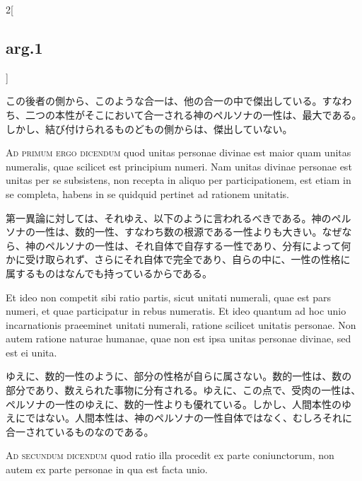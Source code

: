 \documentclass[paper=a4paper,fontsize=10pt,jafontsize=9pt,titlepage]{jlreq}
\begin{document}
\begin{paracol}{2}[\subsection{arg.1}]
\switchcolumn

この後者の側から、このような合一は、他の合一の中で傑出している。すなわ
ち、二つの本性がそこにおいて合一される神のペルソナの一性は、最大である。
しかし、結び付けられるものどもの側からは、傑出していない。

\switchcolumn*[\subsection{ad.1}]

{\scshape Ad primum ergo dicendum} quod unitas personae divinae est
maior quam unitas numeralis, quae scilicet est principium numeri. Nam
unitas divinae personae est unitas per se subsistens, non recepta in
aliquo per participationem, est etiam in se completa, habens in se
quidquid pertinet ad rationem unitatis.

\switchcolumn

第一異論に対しては、それゆえ、以下のように言われるべきである。神のペル
ソナの一性は、数的一性、すなわち数の根源である一性よりも大きい。なぜな
ら、神のペルソナの一性は、それ自体で自存する一性であり、分有によって何
かに受け取られず、さらにそれ自体で完全であり、自らの中に、一性の性格に
属するものはなんでも持っているからである。

\switchcolumn*

Et ideo non competit sibi ratio partis, sicut unitati numerali, quae
est pars numeri, et quae participatur in rebus numeratis. Et ideo
quantum ad hoc unio incarnationis praeeminet unitati numerali, ratione
scilicet unitatis personae. Non autem ratione naturae humanae, quae
non est ipsa unitas personae divinae, sed est ei unita.

\switchcolumn

ゆえに、数的一性のように、部分の性格が自らに属さない。数的一性は、数の
部分であり、数えられた事物に分有される。ゆえに、この点で、受肉の一性は、
ペルソナの一性のゆえに、数的一性よりも優れている。しかし、人間本性のゆ
えにではない。人間本性は、神のペルソナの一性自体ではなく、むしろそれに
合一されているものなのである。

\switchcolumn*[\subsection{ad.2}]

{\scshape Ad secundum dicendum} quod ratio illa procedit ex parte
coniunctorum, non autem ex parte personae in qua est facta unio.

\switchcolumn


\end{paracol}
\end{document}
